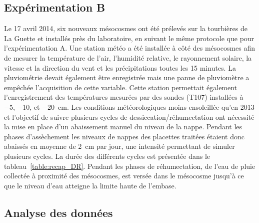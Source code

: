 \subsection{Expérimentation B}
Le 17 avril 2014, six nouveaux mésocosmes ont été prélevés sur la tourbières de La Guette et installés près du laboratoire, en suivant le même protocole que pour l'expérimentation A.
Une station météo a été installée à côté des mésocosmes afin de mesurer la température de l'air, l'humidité relative, le rayonnement solaire, la vitesse et la direction du vent et les précipitations toutes les 15 minutes.
La pluviométrie devait également être enregistrée mais une panne de pluviomètre a empêchée l'acquisition de cette variable.
Cette station permettait également l'enregistrement des températures mesurées par des sondes (T107) installées à \num{-5}, \num{-10}, et \SI{-20}{\centi\metre}.
Les conditions météorologiques moins ensoleillée qu'en 2013 et l'objectif de suivre plusieurs cycles de dessiccation/réhumectation ont nécessité la mise en place d'un abaissement manuel du niveau de la nappe.
Pendant les phases d'assèchement les niveaux de nappes des placettes traitées étaient donc abaissés en moyenne de \SI{2}{\centi\metre} par jour, une intensité permettant de simuler plusieurs cycles.
La durée des différents cycles est présentée dans le tableau~\ref{table:recap_DR}.
Pendant les phases de réhumectation, de l'eau de pluie collectée à proximité des mésocosmes, est versée dans le mésocosme jusqu'à ce que le niveau d'eau atteigne la limite haute de l'embase. 






\subsection{Analyse des données}

